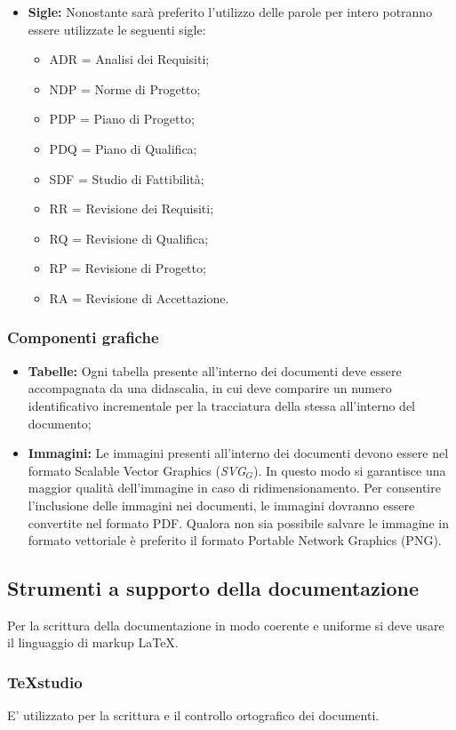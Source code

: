 \begin{itemize}
	\item \textbf{Sigle:} Nonostante sarà preferito l'utilizzo delle parole per intero potranno essere utilizzate le seguenti sigle:
	\begin{itemize}
	\item ADR = Analisi dei Requisiti;
	\item NDP = Norme di Progetto;
	\item PDP = Piano di Progetto;
	\item PDQ = Piano di Qualifica;
	\item SDF = Studio di Fattibilità;
	\item RR = Revisione dei Requisiti;
	\item RQ = Revisione di Qualifica;
	\item RP = Revisione di Progetto;
	\item RA = Revisione di Accettazione.
	\end{itemize}
\end{itemize}
\subsubsection{Componenti grafiche}
	\begin{itemize}
	\item \textbf{Tabelle:} 
	Ogni tabella presente all'interno dei documenti deve essere accompagnata da una didascalia,	in cui deve comparire un numero identificativo incrementale per la tracciatura della stessa all'interno del documento;
	\item \textbf{Immagini:}
	Le immagini presenti all'interno dei documenti devono essere nel formato Scalable Vector Graphics (\textit{SVG$_{G}$}). In questo modo si garantisce una maggior qualità dell'immagine in caso di ridimensionamento. Per consentire l’inclusione delle immagini nei documenti,
	le immagini dovranno essere convertite nel formato PDF. Qualora non sia possibile
	salvare le immagine in formato vettoriale è preferito il formato Portable Network
	Graphics (PNG).
	\end{itemize}
\subsection{Strumenti a supporto della documentazione}
Per la scrittura della documentazione in modo coerente e uniforme si deve usare il linguaggio di markup \LaTeX.
\subsubsection{TeXstudio}
E' utilizzato per la scrittura e il controllo ortografico dei documenti.
